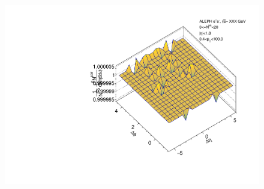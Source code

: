 \begin{figure}[htbp]
\begin{minipage}[b]{0.32\linewidth}
    \label{fig:LEP2 Thrust Axis, Ratio Plot, Multiplicity 0-20, Anthony}
  \end{minipage}
  \begin{minipage}[b]{0.32\linewidth}
    \centering
    \includegraphics[width=\linewidth]{images/TwoParticleCorrelation/LEP2_THRUST/LEP2_THRUST_r_ratio_0_20.pdf}
    \label{fig:LEP2 Thrust Axis, Ratio Plot, Multiplicity 0-20, Ratio}
  \end{minipage}
\end{figure}


